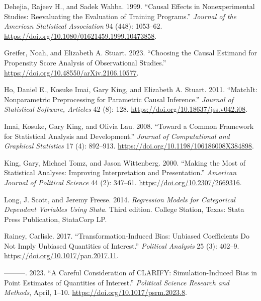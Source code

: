 \hypertarget{refs}{}
\begin{CSLReferences}{1}{0}
\leavevmode{}%
Dehejia, Rajeev H., and Sadek Wahba. 1999. {``Causal Effects in Nonexperimental Studies: Reevaluating the Evaluation of Training Programs.''} \emph{Journal of the American Statistical Association} 94 (448): 1053--62. \url{https://doi.org/10.1080/01621459.1999.10473858}.

\leavevmode{}%
Greifer, Noah, and Elizabeth A. Stuart. 2023. {``Choosing the Causal Estimand for Propensity Score Analysis of Observational Studies.''} \url{https://doi.org/10.48550/arXiv.2106.10577}.

\leavevmode{}%
Ho, Daniel E., Kosuke Imai, Gary King, and Elizabeth A. Stuart. 2011. {``MatchIt: Nonparametric Preprocessing for Parametric Causal Inference.''} \emph{Journal of Statistical Software, Articles} 42 (8): 128. \url{https://doi.org/10.18637/jss.v042.i08}.

\leavevmode{}%
Imai, Kosuke, Gary King, and Olivia Lau. 2008. {``Toward a Common Framework for Statistical Analysis and Development.''} \emph{Journal of Computational and Graphical Statistics} 17 (4): 892--913. \url{https://doi.org/10.1198/106186008X384898}.

\leavevmode{}%
King, Gary, Michael Tomz, and Jason Wittenberg. 2000. {``Making the Most of Statistical Analyses: Improving Interpretation and Presentation.''} \emph{American Journal of Political Science} 44 (2): 347--61. \url{https://doi.org/10.2307/2669316}.

\leavevmode{}%
Long, J. Scott, and Jeremy Freese. 2014. \emph{Regression Models for Categorical Dependent Variables Using Stata}. Third edition. College Station, Texas: Stata Press Publication, StataCorp LP.

\leavevmode{}%
Rainey, Carlisle. 2017. {``Transformation-Induced Bias: Unbiased Coefficients Do Not Imply Unbiased Quantities of Interest.''} \emph{Political Analysis} 25 (3): 402--9. \url{https://doi.org/10.1017/pan.2017.11}.

\leavevmode{}%
---------. 2023. {``A Careful Consideration of {CLARIFY}: Simulation-Induced Bias in Point Estimates of Quantities of Interest.''} \emph{Political Science Research and Methods}, April, 1--10. \url{https://doi.org/10.1017/psrm.2023.8}.


\end{CSLReferences}
